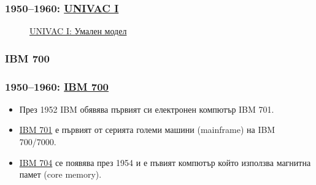 \documentclass[ignorenonframetext, hyperref=unicode]{beamer}
\begin{document}
\begin{frame}
\frametitle{1950--1960: \href{http://en.wikipedia.org/wiki/UNIVAC_I}{UNIVAC I}}
\begin{figure}[h]
\center
{}
\caption{\href{http://americanhistory.si.edu/collections/comphist/objects/univac.htm}{UNIVAC I:
Умален модел}}
\end{figure}
\end{frame}

\subsubsection{IBM 700}

\begin{frame}
\frametitle{1950--1960: \href{http://en.wikipedia.org/wiki/IBM_700/7000_series}{IBM 700}}
\begin{itemize}
  \item През 1952 IBM обявява първият си електронен компютър IBM 701.
  \item 
  \href{http://www-03.ibm.com/ibm/history/exhibits/701/701_1415bx01.html}{IBM
  701} е първият от серията големи машини (mainframe) на IBM 700/7000.  
  \item \href{http://en.wikipedia.org/wiki/IBM_704}{IBM 704} се появява през
  1954 и е пъвият компютър който използва магнитна памет (core memory).
\end{itemize}
\end{frame}
        
\end{document}
